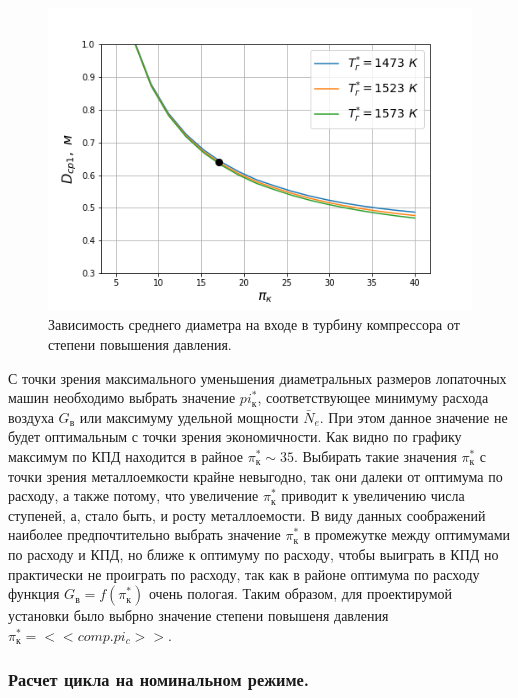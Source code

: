 \documentclass[a4paper,12pt]{article}
\begin{document}
    \begin{figure}[h!]
        \centering
        \includegraphics[scale=0.8]{../plots/cycle_D_av1.png}
        \caption{Зависимость среднего диаметра на входе в турбину компрессора от степени повышения давления.}
        \label{cycle_D_av1}
    \end{figure}

    С точки зрения максимального уменьшения диаметральных размеров лопаточных машин необходимо выбрать
    значение $pi_к^*$, соответствующее минимуму расхода воздуха $G_в$ или максимуму удельной мощности $\bar{N}_e$.
    При этом данное значение не будет оптимальным с точки зрения экономичности.
    Как видно по графику максимум по КПД находится в райное $\pi_к^* \sim 35$.
    Выбирать такие значения $\pi_к^*$ с точки зрения металлоемкости крайне невыгодно, так они далеки от оптимума
    по расходу, а также потому, что увеличение $\pi_к^*$ приводит к увеличению числа ступеней, а, стало быть, и
    росту металлоемости.
    В виду данных соображений наиболее предпочтительно выбрать значение $\pi_к^*$ в промежутке между оптимумами
    по расходу и КПД, но ближе к оптимуму по расходу, чтобы выиграть в КПД но практически не проиграть по расходу,
    так как в районе оптимума по расходу функция $G_в = f(\pi_к^*)$ очень пологая.
    Таким образом, для проектирумой установки было выбрно значение степени повышеня давления $\pi_к^* = <<comp.pi_c>>$.

    \subsubsection{Расчет цикла на номинальном режиме.}
\end{document}

